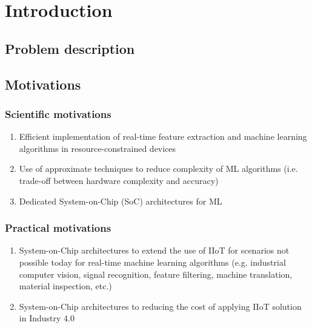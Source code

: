 \section{Introduction}


\subsection{Problem description}


\subsection{Motivations}



\subsubsection{Scientific motivations}
\begin{enumerate}
	\item Efficient implementation of real-time feature extraction and machine learning algorithms in resource-constrained devices
	\item Use of approximate techniques to reduce complexity of ML algorithms (i.e. trade-off between hardware complexity and accuracy)
	\item Dedicated System-on-Chip (SoC) architectures for ML
\end{enumerate}

\subsubsection{Practical motivations}
\begin{enumerate}
	\item System-on-Chip architectures to extend the use of IIoT for scenarios not possible today for real-time machine learning algorithms (e.g. industrial computer vision, signal recognition, feature filtering, machine translation, material inspection, etc.)
	\item System-on-Chip architectures to reducing the cost of applying IIoT solution in Industry 4.0
\end{enumerate}